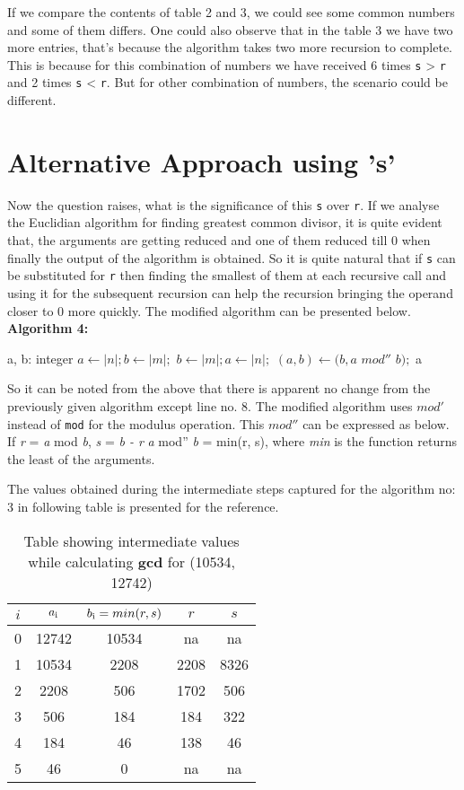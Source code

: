 \documentclass[12pt]{article}
\begin{document}
If we compare the contents of table 2 and 3, we could see some common numbers and some of them differs. One could also observe that in the table 3 we have two more entries, that's because the algorithm takes two more recursion to complete. This is because for 
this combination of numbers we have received 6 times \texttt{s} > \texttt{r} and 2 times 
\texttt{s} < \texttt{r}. But for other combination of numbers, the scenario could be different.

\section{Alternative Approach using 's'}
Now the question raises, what is the significance of this \texttt{s} over \texttt{r}.
If we analyse the Euclidian algorithm for finding greatest common divisor, it is quite evident that, the arguments are getting reduced and one of them reduced till 0 when finally the output of the algorithm is obtained. So it is quite natural that if \texttt{s} can be substituted  for \texttt{r} then finding the smallest of them at each recursive call and using it for the subsequent recursion can help the recursion bringing the operand closer to 0 more quickly. The modified algorithm can be presented below.
\newline \textbf{Algorithm 4:}
\begin{algorithmic}[1]
\STATE a, b: integer
	\STATE $a \gets |n|; b \gets |m|;$
\ELSE
	\STATE $b \gets |m|; a \gets |n|;$
\ENDIF
{} 
	\STATE $(a, b) \leftarrow (b, a  $ $mod'' $ $b);$
\ENDWHILE
\RETURN a
\end {algorithmic}

So it can be noted from the above that there is apparent no change from the previously given algorithm except line no. 8. The modified algorithm uses $mod'$ instead of \texttt{mod} for the modulus operation. This $mod''$ can be expressed as below.
If \textit{r} = \textit{a} mod \textit{b}, \textit{s} = \textit{b - r}
\textit{a} mod'' \textit{b} = min(r, s), where \textit{min} is the function returns the least of the arguments.

The values obtained during the intermediate steps captured for the algorithm no: 3 in following table is presented for the reference.

\begin{table}[h!]
\centering
	\begin{tabular}{c | c | c | c| c}
	\hline
	$i$ & $a\textsubscript{i}$ & $b\textsubscript{i} = min(r,s)$ & $r$ & $s$\\ [0.5ex] 
	\hline
		0 & 12742 & 10534 & na   & na \\ 
		1 & 10534 & 2208  & 2208 & 8326\\  
		2 & 2208  & 506   & 1702 & 506\\
		3 & 506   & 184   & 184  & 322\\
		4 & 184   & 46    & 138  & 46\\
		5 & 46    & 0     & na   & na
	\end{tabular}
\caption{Table showing intermediate values while calculating \textbf{gcd} for (10534, 12742)}
\label{table:4}
\end{table}
\end{document}
